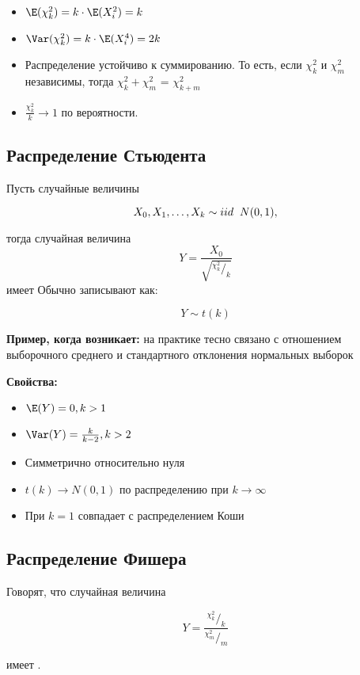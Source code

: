 \begin{itemize} 
\item $\E(\chi^2_k) = k \cdot \E(X_i^2) = k$
\item $\Var(\chi^2_k) = k \cdot \E(X_i^4) = 2k$
\item Распределение устойчиво к суммированию. То есть, если $\chi^2_k$ и $\chi^2_m$ независимы, тогда $\chi^2_k + \chi^2_m$ = $\chi^2_{k+m}$
\item $\frac{\chi^2_k}{k} \to 1$ по вероятности. 
\end{itemize} 


\subsection*{Распределение Стьюдента}

Пусть случайные величины

$$
X_0, X_1, \ldots, X_k \sim iid \hspace{2mm} N(0,1),
$$ 

тогда случайная величина $$ Y = \frac{X_0}{\sqrt{^{\chi^2_k}/_k}} $$ имеет   
Обычно записывают как:

$$
Y \sim t(k)
$$   

\textbf{Пример, когда возникает:} на практике тесно связано с отношением выборочного среднего и стандартного отклонения нормальных выборок

\textbf{Свойства:}

\begin{itemize} 
\item $\E(Y) = 0, k > 1$
\item $\Var(Y) = \frac{k}{k-2}, k > 2$
\item Симметрично относительно нуля
\item $t(k) \to N(0,1)$ по распределению при $k \to \infty$
\item При $k=1$ совпадает с распределением Коши
\end{itemize} 


\subsection*{Распределение Фишера}

Говорят, что случайная величина 

$$ Y = \frac{^{\chi^2_k}/_k}{^{\chi^2_m}/_m}$$

имеет .

